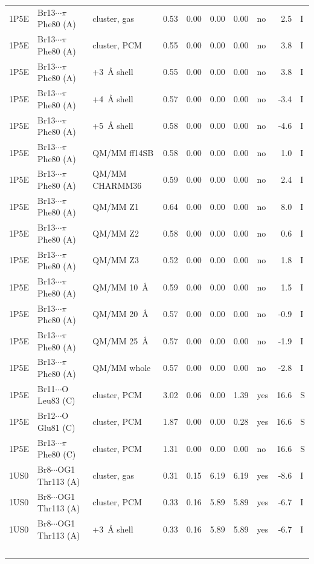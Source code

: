 \documentclass[journal=jcisd8,manuscript=suppinfo]{achemso}
\begin{document}
\begin{singlespace}
{\begin{longtable}{lllrrrrlrl}
1P5E & Br13$\cdots$$\pi$ Phe80 (A) & cluster, gas & 0.53 & 0.00 & 0.00 & 0.00 & no & 2.5 & I\\
1P5E & Br13$\cdots$$\pi$ Phe80 (A) & cluster, PCM & 0.55 & 0.00 & 0.00 & 0.00 & no & 3.8 & I\\
1P5E & Br13$\cdots$$\pi$ Phe80 (A) & +3~\AA{} shell & 0.55 & 0.00 & 0.00 & 0.00 & no & 3.8 & I\\
1P5E & Br13$\cdots$$\pi$ Phe80 (A) & +4~\AA{} shell & 0.57 & 0.00 & 0.00 & 0.00 & no & -3.4 & I\\
1P5E & Br13$\cdots$$\pi$ Phe80 (A) & +5~\AA{} shell & 0.58 & 0.00 & 0.00 & 0.00 & no & -4.6 & I\\
1P5E & Br13$\cdots$$\pi$ Phe80 (A) & QM/MM ff14SB & 0.58 & 0.00 & 0.00 & 0.00 & no & 1.0 & I\\
1P5E & Br13$\cdots$$\pi$ Phe80 (A) & QM/MM CHARMM36 & 0.59 & 0.00 & 0.00 & 0.00 & no & 2.4 & I\\
1P5E & Br13$\cdots$$\pi$ Phe80 (A) & QM/MM Z1 & 0.64 & 0.00 & 0.00 & 0.00 & no & 8.0 & I\\
1P5E & Br13$\cdots$$\pi$ Phe80 (A) & QM/MM Z2 & 0.58 & 0.00 & 0.00 & 0.00 & no & 0.6 & I\\
1P5E & Br13$\cdots$$\pi$ Phe80 (A) & QM/MM Z3 & 0.52 & 0.00 & 0.00 & 0.00 & no & 1.8 & I\\
1P5E & Br13$\cdots$$\pi$ Phe80 (A) & QM/MM 10~\AA{} & 0.59 & 0.00 & 0.00 & 0.00 & no & 1.5 & I\\
1P5E & Br13$\cdots$$\pi$ Phe80 (A) & QM/MM 20~\AA{} & 0.57 & 0.00 & 0.00 & 0.00 & no & -0.9 & I\\
1P5E & Br13$\cdots$$\pi$ Phe80 (A) & QM/MM 25~\AA{} & 0.57 & 0.00 & 0.00 & 0.00 & no & -1.9 & I\\
1P5E & Br13$\cdots$$\pi$ Phe80 (A) & QM/MM whole & 0.57 & 0.00 & 0.00 & 0.00 & no & -2.8 & I\\
1P5E & Br11$\cdots$O Leu83 (C) & cluster, PCM & 3.02 & 0.06 & 0.00 & 1.39 & yes & 16.6 & S\\
1P5E & Br12$\cdots$O Glu81 (C) & cluster, PCM & 1.87 & 0.00 & 0.00 & 0.28 & yes & 16.6 & S\\
1P5E & Br13$\cdots$$\pi$ Phe80 (C) & cluster, PCM & 1.31 & 0.00 & 0.00 & 0.00 & no & 16.6 & S\\
1US0 & Br8$\cdots$OG1 Thr113 (A) & cluster, gas & 0.31 & 0.15 & 6.19 & 6.19 & yes & -8.6 & I\\
1US0 & Br8$\cdots$OG1 Thr113 (A) & cluster, PCM & 0.33 & 0.16 & 5.89 & 5.89 & yes & -6.7 & I\\
1US0 & Br8$\cdots$OG1 Thr113 (A) & +3~\AA{} shell & 0.33 & 0.16 & 5.89 & 5.89 & yes & -6.7 & I\\
$$
\end{longtable}}
\end{singlespace}
\end{document}
